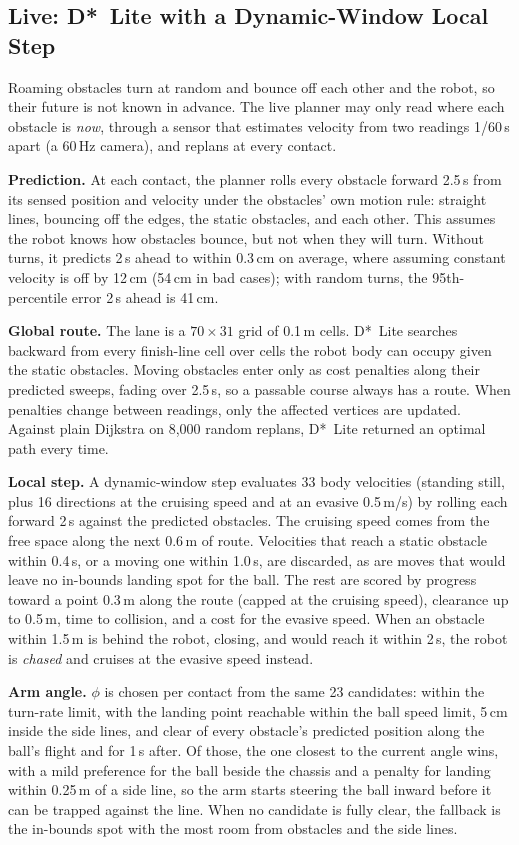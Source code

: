 \documentclass[10pt,twocolumn]{article}
\begin{document}
\subsection{Live: D*~Lite with a Dynamic-Window Local Step}
\label{sec:live}
Roaming obstacles turn at random and bounce off each other and the robot,
so their future is not known in advance. The live planner may only read
where each obstacle is \emph{now}, through a sensor that estimates velocity
from two readings 1/60\,s apart (a 60\,Hz camera), and replans at every
contact.

\textbf{Prediction.} At each contact, the planner rolls every obstacle
forward 2.5\,s from its sensed position and velocity under the obstacles'
own motion rule: straight lines, bouncing off the edges, the static
obstacles, and each other. This assumes the robot knows how obstacles
bounce, but not when they will turn. Without turns, it predicts 2\,s ahead
to within 0.3\,cm on average, where assuming constant velocity is off by
12\,cm (54\,cm in bad cases); with random turns, the 95th-percentile error
2\,s ahead is 41\,cm.

\textbf{Global route.} The lane is a $70\times31$ grid of 0.1\,m cells.
D*~Lite \cite{koenig2002} searches backward from every finish-line cell
over cells the robot body can occupy given the static obstacles. Moving
obstacles enter only as cost penalties along their predicted sweeps,
fading over 2.5\,s, so a passable course always has a route. When
penalties change between readings, only the affected vertices are
updated. Against plain Dijkstra on 8{,}000 random replans, D*~Lite
returned an optimal path every time.

\textbf{Local step.} A dynamic-window step \cite{fox1997} evaluates 33
body velocities (standing still, plus 16 directions at the cruising speed
and at an evasive 0.5\,m/s) by rolling each forward 2\,s against the
predicted obstacles. The cruising speed comes from the free space along
the next 0.6\,m of route. Velocities that reach a static obstacle within
0.4\,s, or a moving one within 1.0\,s, are discarded, as are moves that
would leave no in-bounds landing spot for the ball. The rest are scored
by progress toward a point 0.3\,m along the route (capped at the cruising
speed), clearance up to 0.5\,m, time to collision, and a cost for the
evasive speed. When an obstacle within 1.5\,m is behind the robot,
closing, and would reach it within 2\,s, the robot is \emph{chased} and
cruises at the evasive speed instead.

\textbf{Arm angle.} $\phi$ is chosen per contact from the same 23
candidates: within the turn-rate limit, with the landing point reachable
within the ball speed limit, 5\,cm inside the side lines, and clear of
every obstacle's predicted position along the ball's flight and for 1\,s
after. Of those, the one closest to the current angle wins, with a mild
preference for the ball beside the chassis and a penalty for landing
within 0.25\,m of a side line, so the arm starts steering the ball inward
before it can be trapped against the line. When no candidate is fully
clear, the fallback is the in-bounds spot with the most room from
obstacles and the side lines.
\end{document}
